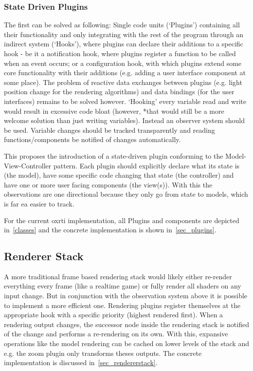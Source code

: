 \subsubsection{State Driven Plugins}
The first can be solved as following: Single code units (`Plugins')
containing all their functionality and only integrating with the rest of the
program through an indirect system (`Hooks'), where plugins can declare their
additions to a specific hook - be it a notification hook, where plugins register
a function to be called when an event occurs; or a configuration hook, with
which plugins extend some core functionality with their additions (e.g. adding a
user interface component at some place). The problem of reactive data
exchanges between plugins (e.g. light position change for the rendering
algorithms) and data bindings (for the user interfaces) remains to be solved however.
`Hooking' every variable read and write would result in excessive code bloat
(however, *that would still be a more welcome solution than just writing
variables). Instead an observer system should be used. Variable changes should
be tracked transparently and reading functions/components be notified of changes
automatically.

This proposes the introduction of a state-driven plugin conforming to the
Model-View-Controller pattern. Each plugin should explicitly declare what its
state is (the model), have some specific code changing that state (the
controller) and have one or more user facing components (the view(s)). With this
the observations are one directional because they only go
from state to models, which is far ea easier to track.

For the current oxrti implementation, all Plugins and components are depicted
in~\autoref{classes} and the concrete implementation is shown in~\autoref{sec_plugins}.


\subsection{Renderer Stack}
A more traditional frame based rendering stack would likely either re-render
everything every frame (like a realtime game) or fully render all shaders on any input change. But in conjunction with the observation system
above it is possible to implement a more efficient one. Rendering plugins
register themselves at the appropriate hook with a specific priority (highest
rendered first). When a rendering output changes, the successor node inside the
rendering stack is notified of the change and performs a re-rendering on its own.
With this, expansive operations like the model rendering can be cached on lower
levels of the stack and e.g. the zoom plugin only transforms theses outputs.
The concrete implementation is discussed in~\autoref{sec_rendererstack}.